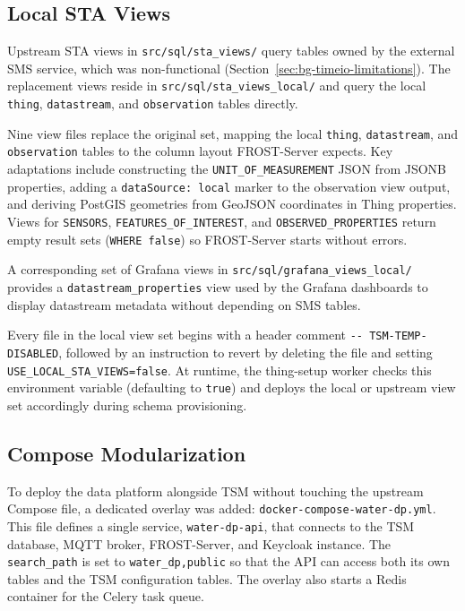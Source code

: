 \subsection{Local STA Views}
\label{sec:impl-tsm-staviews}

Upstream STA views in \texttt{src/sql/sta\_views/} query tables owned by the external SMS service,
which was non-functional (Section~\ref{sec:bg-timeio-limitations}). The replacement views reside in
\texttt{src/sql/sta\_views\_local/} and query the local \texttt{thing}, \texttt{datastream}, and
\texttt{observation} tables directly.

Nine view files replace the original set, mapping the local \texttt{thing},
\texttt{datastream}, and \texttt{observation} tables to the column layout FROST-Server
expects. Key adaptations include constructing the \texttt{UNIT\_OF\_MEASUREMENT} JSON from
JSONB properties, adding a \texttt{dataSource: local} marker to the observation view output, and deriving
PostGIS geometries from GeoJSON coordinates in Thing properties. Views for
\texttt{SENSORS}, \texttt{FEATURES\_OF\_INTEREST}, and \texttt{OBSERVED\_PROPERTIES}
return empty result sets (\texttt{WHERE false}) so FROST-Server starts without errors.

A corresponding set of Grafana views in \texttt{src/sql/grafana\_views\_local/} provides
a \texttt{datastream\_properties} view used by the Grafana dashboards to display datastream
metadata without depending on SMS tables.

Every file in the local view set begins with a header comment
\texttt{-{}-~TSM-TEMP-DISABLED}, followed by an instruction to revert by deleting the file
and setting \texttt{USE\_LOCAL\_STA\_VIEWS=false}. At runtime, the thing-setup worker checks
this environment variable (defaulting to \texttt{true}) and deploys the local or upstream
view set accordingly during schema provisioning.

\subsection{Compose Modularization}
\label{sec:impl-tsm-compose}

To deploy the data platform alongside TSM without touching the upstream Compose file, a
dedicated overlay was added:
\texttt{docker-compose-water-dp.yml}. This file defines a single service, \texttt{water-dp-api},
that connects to the TSM database, MQTT broker, FROST-Server, and Keycloak instance. The
\texttt{search\_path} is set to \texttt{water\_dp,public} so that the API can access both its own
tables and the TSM configuration tables. The overlay also starts a Redis container for the Celery
task queue.

